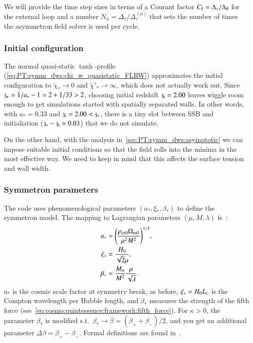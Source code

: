     We will provide the time step sizes %
    in terms of a Courant factor $C_\mathrm{f}=\Delta_\tau/\Delta_\#$ for the external loop and a number $N_\phi=\Delta_\tau/\Delta_\tau^{(\phi)}$ that sets the number of times the asymmetron field solver is used per cycle. 

\subsubsection{Initial configuration}

    The normal quasi-static $\tanh$-profile (\cref{eq:PT:symm_dws:chi_w_quasistatic_FLRW}) approximates the initial configuration to $\breve{\chi}_\ast\to0$ and $\breve{\chi}'_\ast \to \infty$, which does not actually work out. %
    Since $\mathfrak{z}_\ast=1/a_\ast-1 = 2 + 1/33 > 2$, choosing initial redshift $\mathfrak{z}_\mathrm{i}=2.00$ leaves wiggle room enough to get simulations started with spatially separated walls. In other words, with $a_\ast=0.33$ and $\mathfrak{z}_\mathrm{i}=2.00< \mathfrak{z}_\ast$, there is a tiny slot between SSB and initialiation ($\mathfrak{z}_\ast-\mathfrak{z}_\mathrm{i} \approx 0.03$) that we do not simulate.
    
    On the other hand, with the analysis in~\cref{sec:PT:symm_dws:asymptotic} we can impose suitable initial conditions so that the field rolls into the minima in the most effective way. We need to keep in mind that this affects the surface tension and wall width.



\subsubsection{Symmetron parameters}
    The code uses phenomenological parameters $(a_\ast, \xi_\ast, \beta_\ast)$ to define the symmetron model. The mapping to Lagrangian parameters $(\mu, M, \lambda)$ is~\citep{christiansenAsevolutionRelativisticNbody2023}:
    \begin{subequations}\label{eq:PT:sims:mapping_symmetron_params}
        \begin{align}
            a_\ast &=  {\left( \frac{\rho_\mathrm{cr0} \Omega_\mathrm{m0}}{\mu^2 M^2} \right)}^{1/3},\\
            \xi_\ast &= \frac{H_0}{\sqrt{2}\mu}, \\
            \beta_\ast &=\frac{M_{\text{\tiny{Pl}}}}{M^2} \frac{\mu}{\sqrt{\lambda}}.
        \end{align}
    \end{subequations}
    $a_\ast$ is the cosmic scale factor at symmetry break, as before, $\xi_\ast= H_0 L_{\text{\tiny{C}}}$ is the Compton wavelength per Hubble length, and $\beta_\ast$ measures the strength of the fifth force (see~\cref{eq:cosmo:quintessence:framework:fifth_force}). %
    For $\kappa>0$, the parameter $\beta_\ast$ is modified s.t.~$\beta_\ast \to \bar{\beta}= (\beta_+ + \beta_-)/2$, and you get an additional parameter $\Delta \beta = \beta_+- \beta_-$. Formal definitions are found in~\citet{christiansenAsevolutionRelativisticNbody2023}. %


